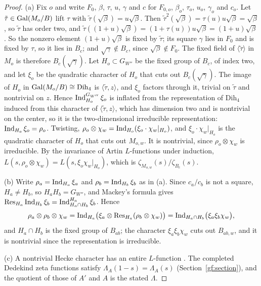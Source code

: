\begin{proof}
(a) Fix $o$ and write $F_0$, $\beta$, $\tau$, $u$, $\gamma$ and $c$ for
$F_{0,o}$, $\beta_o$, $\tau_o$, $u_o$, $\gamma_o$ and $c_o$. Let
$\tilde\tau\in\operatorname{Gal}(M_o/B)$ lift $\tau$ with $\tilde\tau(\sqrt\beta)=u\sqrt\beta$.
Then $\tilde\tau^2(\sqrt\beta)=\tau(u)u\sqrt\beta=\sqrt\beta$, so $\tilde\tau$
has order two, and
$\tilde\tau((1+u)\sqrt\beta)=(1+\tau(u))u\sqrt\beta=(1+u)\sqrt\beta$. So the
nonzero element $(1+u)\sqrt\beta$ is fixed by $\tilde\tau$; its square
$\gamma$ lies in $F_0$ and is fixed by $\tau$, so it lies in $B_c$; and
$\sqrt\gamma\notin B_c$, since $\sqrt\beta\notin F_0$. The fixed field of
$\langle\tilde\tau\rangle$ in $M_o$ is therefore $B_c(\sqrt\gamma)$. Let
$H_o\subset G_{W''}$ be the fixed group of $B_c$, of index two, and let
$\xi_o$ be the quadratic character of $H_o$ that cuts out $B_c(\sqrt\gamma)$.
The image of $H_o$ in $\operatorname{Gal}(M_o/B)\cong\mathrm{Dih}_4$ is
$\langle\tilde\tau,z\rangle$, and $\xi_o$ factors through it, trivial on
$\tilde\tau$ and nontrivial on $z$. Hence $\operatorname{Ind}_{H_o}^{G_{W''}}\xi_o$ is
inflated from the representation of $\mathrm{Dih}_4$ induced from this
character of $\langle\tilde\tau,z\rangle$, which has dimension two and is
nontrivial on the center, so it is the two-dimensional irreducible
representation: $\operatorname{Ind}_{H_o}\xi_o=\rho_o$. Twisting,
$\rho_o\otimes\chi_w=\operatorname{Ind}_{H_o}(\xi_o\cdot\chi_w|_{H_o})$, and
$\xi_o\cdot\chi_w|_{H_o}$ is the quadratic character of $H_o$ that cuts out
$M_{o,w}$. It is nontrivial, since $\rho_o\otimes\chi_w$ is irreducible. By
the invariance of Artin $L$-functions under induction,
$L(s,\rho_o\otimes\chi_w)=L(s,\xi_o\chi_w|_{H_o})$, which is
$\zeta_{M_{o,w}}(s)/\zeta_{B_c}(s)$.

(b) Write $\rho_a=\operatorname{Ind}_{H_a}\xi_a$ and $\rho_b=\operatorname{Ind}_{H_b}\xi_b$ as in (a). Since
$c_a/c_b$ is not a square, $H_a\ne H_b$, so $H_aH_b=G_{W''}$, and Mackey's
formula \cite[Section~7.3]{Serre1977} gives
$\operatorname{Res}_{H_a}\operatorname{Ind}_{H_b}\xi_b=\operatorname{Ind}_{H_a\cap H_b}^{H_a}\xi_b$. Hence
\[
 \rho_a\otimes\rho_b\otimes\chi_w
 =\operatorname{Ind}_{H_a}\bigl(\xi_a\otimes\operatorname{Res}_{H_a}(\rho_b\otimes\chi_w)\bigr)
 =\operatorname{Ind}_{H_a\cap H_b}\bigl(\xi_a\xi_b\chi_w\bigr),
\]
and $H_a\cap H_b$ is the fixed group of $B_{ab}$; the character
$\xi_a\xi_b\chi_w$ cuts out $B_{ab,w}$, and it is nontrivial since the
representation is irreducible.

(c) A nontrivial Hecke character has an entire $L$-function
\cite{Hecke1920,Tate1967}. The completed Dedekind zeta functions satisfy
$\Lambda_A(1-s)=\Lambda_A(s)$ (Section~\ref{gf:section}), and the quotient of
those of $A'$ and $A$ is the stated $\Lambda$.
\end{proof}

